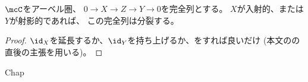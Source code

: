 \documentclass[uplatex,dvipdfmx]{jsarticle}
\begin{document}
\maketitle
\HeaderCommentA
\section{}
\fi

\begin{prob}\label{1.5}
  \(\mcC\)をアーベル圏、
  \(0\to X\to Z\to Y\to 0\)を完全列とする。
  \(X\)が入射的、または\(Y\)が射影的であれば、
  この完全列は分裂する。
\end{prob}

\begin{proof}
  \(\id_X\)を延長するか、\(\id_Y\)を持ち上げるか、をすれば良いだけ
  (本文の\cite[Definition 1.2.8]{kashiwara2002sheaves}の直後の主張を用いる)。
\end{proof}

\ifcsname Chap\endcsname\else
\printbibliography
\end{document}
